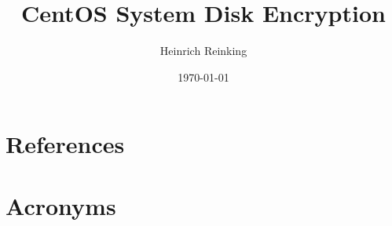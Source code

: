 \documentclass[PMO,authoryear,toc]{lsstdoc}
\title{CentOS System Disk Encryption}
\author{%
Heinrich Reinking
}
\date {\today}
\begin{document}
\maketitle



\appendix
\section{References} \label{sec:bib}
\renewcommand{\refname}{} %


\section{Acronyms} \label{sec:acronyms}
\newpage

\end{document}
